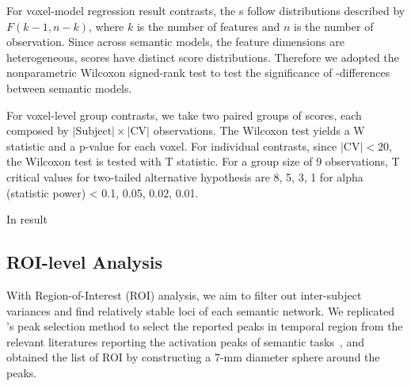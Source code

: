 For voxel-model regression result contrasts, the s follow distributions described by \(F(k-1, n-k)\), where \(k\) is the number of features and \(n\) is the number of observation. Since across semantic models, the feature dimensions are heterogeneous,  scores have distinct score distributions. Therefore we adopted the nonparametric Wilcoxon signed-rank test to test the significance of -differences between semantic models. 

For voxel-level group contrasts, we take two paired groups of  scores, each composed by \( \lvert \text{Subject} \rvert \times \lvert \text{CV} \rvert \) observations. The Wilcoxon test yields a W statistic and a p-value for each voxel. For individual contrasts, since \(\lvert \text{CV} \rvert < 20\), the Wilcoxon test is tested with T statistic. For a group size of 9 observations, T critical values for two-tailed alternative hypothesis are 8, 5, 3, 1 for alpha (statistic power) < 0.1, 0.05, 0.02, 0.01.

In result

\subsection{ROI-level Analysis}

With Region-of-Interest (ROI) analysis, we aim to filter out inter-subject variances and find relatively stable loci of each semantic network. We replicated \textcite{pattersonWhereYouKnow2007}'s peak selection method to select the reported peaks in temporal region from the relevant literatures reporting the activation peaks of semantic tasks~\parencite{devlinSusceptibilityInducedLossSignal2000, mummerycatherinej.GeneratingTigerAnimal1996, priceMetaanalysesObjectNaming2005, rogersAnteriorTemporalCortex2006, brightUnitaryVsMultiple2004, crinionTemporalLobeRegions2003, scottIdentificationPathwayIntelligible2000, gorno-tempiniIdentificationFamousFaces2001, nakamuraFunctionalDelineationHuman2000, gorno-tempiniNeuralSystemsSustaining1998, tsukiuraDissociableRolesBilateral2006, nakamuraNeuralSubstratesRecognition2001, binderHumanTemporalLobe2000,davisHierarchicalProcessingSpoken2003, scottNeuralCorrelatesIntelligibility2006, ferstlEmotionalTemporalAspects2005, noppeneyRetrievalVisualAuditory2002, papathanassiouCommonLanguageNetwork2000, tranelNamingSameEntities2005, mummeryDualProcessModelSemantic1999, smallRoleRightAnterior1997, simonsNeuralMechanismsVisual2003, vuilleumierMultipleLevelsVisual2002, grossmanNeuralBasisSemantic2003},
and obtained the list of ROI by constructing a 7-mm diameter sphere around the peaks.

